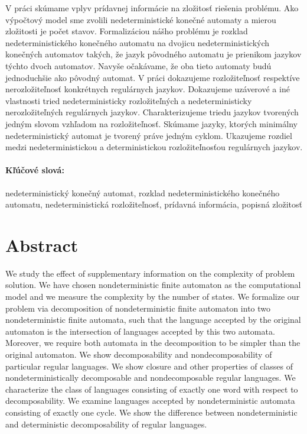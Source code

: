 \documentclass[12pt, oneside]{book}
\begin{document}
V práci skúmame vplyv prídavnej informácie na zložitosť riešenia problému. Ako výpočtový model sme zvolili nedeterministické konečné automaty a mierou zložitosti je počet stavov. Formalizáciou nášho problému je rozklad nedeterministického konečného automatu na dvojicu nedeterministických konečných automatov takých, že jazyk pôvodného automatu je prienikom jazykov týchto dvoch automatov. Navyše očakávame, že oba tieto automaty budú jednoduchšie ako pôvodný automat. V práci dokazujeme rozložiteľnosť respektíve nerozložiteľnosť konkrétnych regulárnych jazykov. Dokazujeme uzáverové a iné vlastnosti tried nedeterministicky rozložiteľných a nedeterministicky nerozložiteľných regulárnych jazykov. Charakterizujeme triedu jazykov tvorených jedným slovom vzhľadom na rozložiteľnosť. Skúmame jazyky, ktorých minimálny nedeterministický automat je tvorený práve jedným cyklom. Ukazujeme rozdiel medzi nedeterministickou a deterministickou rozložiteľnosťou regulárnych jazykov.

\paragraph*{Kľúčové slová:} nedeterministický konečný automat, rozklad nedeterministického konečného automatu, nedeterministická rozložiteľnosť, prídavná informácia, popisná zložitosť


\newpage 
\section*{Abstract}

We study the effect of supplementary information on the complexity of problem solution. We have chosen nondeterministic finite automaton as the computational model and we measure the complexity by the number of states. We formalize our problem via decomposition of nondeterministic finite automaton into two nondeterministic finite automata, such that the language accepted by the original automaton is the intersection of languages accepted by this two automata. Moreover, we require both automata in the decomposition to be simpler than the original automaton. We show decomposability and nondecomposability of particular regular languages. We show closure and other properties of classes of nondeterministically decomposable and nondecomposable regular languages. We characterize the class of languages consisting of exactly one word with respect to decomposability. We examine languages accepted by nondeterministic automata consisting of exactly one cycle. We show the difference between nondeterministic and deterministic decomposability of regular languages.
\end{document}

